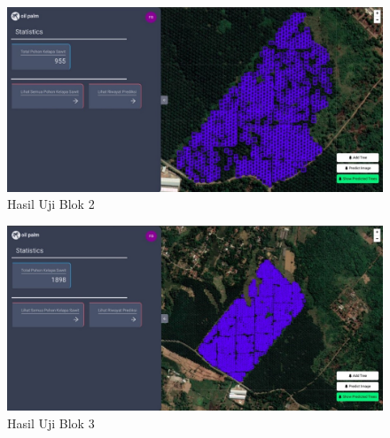 \begin{figure}[H]
	\vspace{-0.1cm}
	\begin{center}
		\includegraphics[width=1\columnwidth]{bab4/Gambar/Picture41.jpg}
	\end{center}
	\vspace{-0.2cm}
	\captionsetup{justification=centering}
	\caption{Hasil Uji Blok 2}\label{img:Hasil-Uji-Blok-2}
\end{figure}

\begin{figure}[H]
	\vspace{-0.1cm}
	\begin{center}
		\includegraphics[width=1\columnwidth]{bab4/Gambar/Picture42.jpg}
	\end{center}
	\vspace{-0.2cm}
	\captionsetup{justification=centering}
	\caption{Hasil Uji Blok 3}\label{img:Hasil-Uji-Blok-3}
\end{figure}

